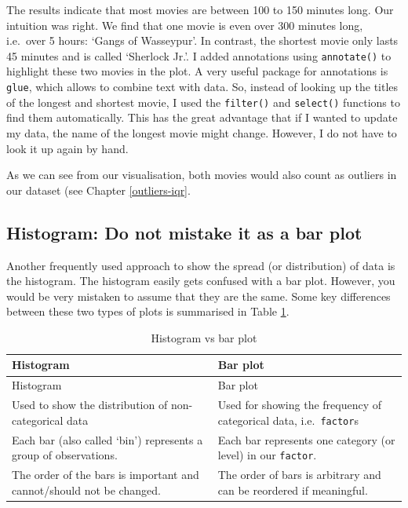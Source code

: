 \documentclass[
]{book}
\begin{document}
The results indicate that most movies are between 100 to 150 minutes long. Our intuition was right. We find that one movie is even over 300 minutes long, i.e.~over 5 hours: `Gangs of Wasseypur'. In contrast, the shortest movie only lasts 45 minutes and is called `Sherlock Jr.'. I added annotations using \texttt{annotate()} to highlight these two movies in the plot. A very useful package for annotations is \texttt{glue}, which allows to combine text with data. So, instead of looking up the titles of the longest and shortest movie, I used the \texttt{filter()} and \texttt{select()} functions to find them automatically. This has the great advantage that if I wanted to update my data, the name of the longest movie might change. However, I do not have to look it up again by hand.

As we can see from our visualisation, both movies would also count as outliers in our dataset (see Chapter \ref{outliers-iqr}.

\hypertarget{histogram-do-not-mistake-it-as-a-bar-plot}{%
\subsection{Histogram: Do not mistake it as a bar plot}\label{histogram-do-not-mistake-it-as-a-bar-plot}}

Another frequently used approach to show the spread (or distribution) of data is the histogram. The histogram easily gets confused with a bar plot. However, you would be very mistaken to assume that they are the same. Some key differences between these two types of plots is summarised in Table \ref{tab:histogram-vs-bar-plot}.

\begin{longtable}[]{@{}
  >{\raggedright\arraybackslash}p{}
  >{\raggedright\arraybackslash}p{}@{}}
\caption{\label{tab:histogram-vs-bar-plot} Histogram vs bar plot}\tabularnewline
\toprule
Histogram & Bar plot \\
\midrule
\endfirsthead
\toprule
Histogram & Bar plot \\
\midrule
\endhead
Used to show the distribution of non-categorical data & Used for showing the frequency of categorical data, i.e.~\texttt{factor}s \\
Each bar (also called `bin') represents a group of observations. & Each bar represents one category (or level) in our \texttt{factor}. \\
The order of the bars is important and cannot/should not be changed. & The order of bars is arbitrary and can be reordered if meaningful. \\
\bottomrule
\end{longtable}
\end{document}
